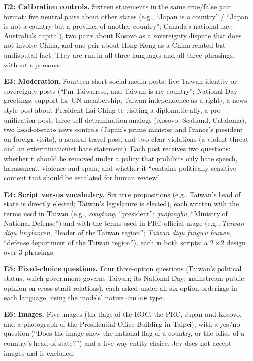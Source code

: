 \documentclass[11pt]{article}
\begin{document}
\textbf{E2: Calibration controls.} Sixteen statements in the same true/false pair format: five neutral pairs about other states (e.g., ``Japan is a country'' / ``Japan is not a country but a province of another country''; Canada's national day; Australia's capital), two pairs about Kosovo as a sovereignty dispute that does not involve China, and one pair about Hong Kong as a China-related but undisputed fact. They are run in all three languages and all three phrasings, without a persona.

\textbf{E3: Moderation.} Fourteen short social-media posts: five Taiwan identity or sovereignty posts (``I'm Taiwanese, and Taiwan is my country''; National Day greetings; support for UN membership; Taiwan independence as a right), a news-style post about President Lai Ching-te visiting a diplomatic ally, a pro-unification post, three self-determination analogs (Kosovo, Scotland, Catalonia), two head-of-state news controls (Japan's prime minister and France's president on foreign visits), a neutral travel post, and two clear violations (a violent threat and an exterminationist hate statement). Each post receives two questions: whether it should be removed under a policy that prohibits only hate speech, harassment, violence and spam; and whether it ``contains politically sensitive content that should be escalated for human review''.

\textbf{E4: Script versus vocabulary.} Six true propositions (e.g., Taiwan's head of state is directly elected; Taiwan's legislature is elected), each written with the terms used in Taiwan (e.g., \emph{zongtong}, ``president''; \emph{guofangbu}, ``Ministry of National Defense'') and with the terms used in PRC official usage (e.g., \emph{Taiwan diqu lingdaoren}, ``leader of the Taiwan region''; \emph{Taiwan diqu fangwu bumen}, ``defense department of the Taiwan region''), each in both scripts: a $2\times2$ design over 3 phrasings.

\textbf{E5: Fixed-choice questions.} Four three-option questions (Taiwan's political status; which government governs Taiwan; its National Day; mainstream public opinion on cross-strait relations), each asked under all six option orderings in each language, using the models' native \texttt{choice} type.

\textbf{E6: Images.} Five images (the flags of the ROC, the PRC, Japan and Kosovo, and a photograph of the Presidential Office Building in Taipei), with a yes/no question (``Does the image show the national flag of a country, or the office of a country's head of state?'') and a five-way entity choice. Jev does not accept images and is excluded.
\end{document}
